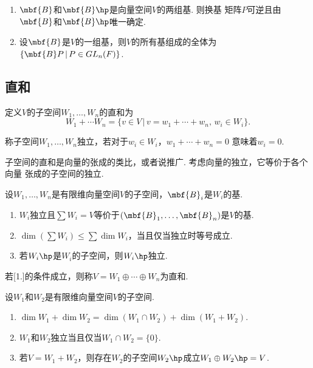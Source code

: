   \begin{pos}
    $\,$
    \begin{enumerate}
      \item $\mbf{B}$和$\mbf{B}\hp$是向量空间$V$的两组基. 则换基
        矩阵$P$可逆且由$\mbf{B}$和$\mbf{B}\hp$唯一确定.
      \item 设$\mbf{B}$是$V$的一组基，则$V$的所有基组成的全体为
        $\{\mbf{B}P\,|\, P\in GL_n(F)\}$.
    \end{enumerate}
  \end{pos}

\subsection{直和}

  \begin{defi}[直和]
    定义$V$的子空间$W_1,\dots,W_n$的直和为
    \[
      W_1 + \cdots W_n = \{v\in V\,|\, v=w_1+\cdots+w_n,\,w_i\in W_i\}.
    \]
  \end{defi}

  \begin{defi}[独立]
    称子空间$W_1,\dots,W_n$独立，若对于$w_i\in W_i$，$w_1+\cdots+w_n=0$
    意味着$w_i=0$.
  \end{defi}
  \remark
    子空间的直和是向量的张成的类比，或者说推广. 考虑向量的独立，它等价于各个向量
    张成的子空间的独立.

  \begin{pos}
    设$W_1,\dots,W_n$是有限维向量空间$V$的子空间，$\mbf{B}_i$是$W_i$的基.
    \begin{enumerate}
      \item $W_i$独立且$\sum W_i=V$等价于$(\mbf{B}_1,\dots,\mbf{B}_n)$是$V$的基.
      \item $\dim(\sum W_i)\le\sum\dim W_i$，当且仅当独立时等号成立.
      \item 若$W_i\hp$是$W_i$的子空间，则$W_i\hp$独立.
    \end{enumerate}
  \end{pos}
  \remark
    若[1.]的条件成立，则称$V=W_1\oplus\cdots\oplus W_n$为直和.

  \begin{thm}
    设$W_1$和$W_2$是有限维向量空间$V$的子空间.
    \begin{enumerate}
      \item $\dim W_1 + \dim W_2 = \dim(W_1\cap W_2)+\dim(W_1+W_2)$.
      \item $W_1$和$W_2$独立当且仅当$W_1\cap W_2=\{0\}$.
      \item 若$V=W_1+W_2$，则存在$W_2$的子空间$W_2\hp$成立$W_1\oplus W_2\hp=V$.
    \end{enumerate}
  \end{thm}


